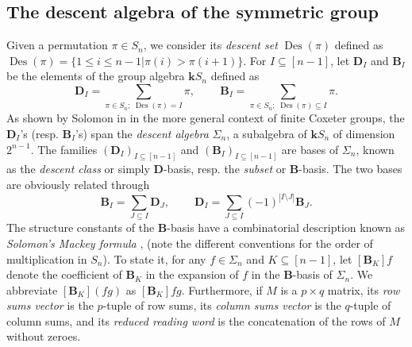 \documentclass[revision]{FPSAC2025}
\newcommand{\Des}{\operatorname{Des}}
\begin{document}
\subsection{The descent algebra of the symmetric group}
Given a permutation $\pi \in S_n$, we consider its \emph{descent set} $\Des(\pi)$ defined as $\Des(\pi) = \{1\leq i\leq n-1| \pi(i)>\pi(i+1)\}.$ 
For $I \subseteq [n-1]$, let $\mathbf{D}_I$ and $\mathbf{B}_I$ be the elements of the group algebra $\mathbf{k}S_n$ defined as \begin{equation*}
\mathbf{D}_I = \sum_{\pi \in S_n; \; \Des(\pi) = I}\pi, \;\;\;\;\;\;\;\; \mathbf{B}_I = \sum_{\pi \in S_n; \; \Des(\pi) \subseteq I}\pi.
\end{equation*} 
As shown by Solomon in \cite{Sol76} in the more general context of finite Coxeter groups, the $\mathbf{D}_I$'s (resp. $\mathbf{B}_I$'s) span the \emph{descent algebra} $\Sigma_n$, a subalgebra of $\mathbf{k}S_n$ of dimension $2^{n-1}$. The families $(\mathbf{D}_I)_{I\subseteq [n-1]}$ and $(\mathbf{B}_I)_{I\subseteq [n-1]}$ are bases of $\Sigma_n$, known as the \emph{descent class} or simply $\mathbf{D}$-basis, resp. the \emph{subset} or $\mathbf{B}$-basis.
The two bases are obviously related through
\begin{equation}
\label{equation.bidj}
\mathbf{B}_I = \sum_{J \subseteq I} \mathbf{D}_J, \;\;\;\;\;\;\;\; \mathbf{D}_I = \sum_{J \subseteq I}(-1)^{|I\setminus J|}\mathbf{B}_J.
\end{equation} 
The structure constants of the $\mathbf{B}$-basis have a combinatorial description %
known as \emph{Solomon's Mackey formula} \cite[Theorem 2]{Willigenburg98}, \cite[Prop. 4.3]{BleLau92} (note the different conventions for the order of multiplication in $S_n$).
To state it, for any $f \in \Sigma_n$ and $K \subseteq [n-1]$, let $[\mathbf{B}_K]f$ denote the coefficient of $\mathbf{B}_K$ in the expansion of $f$ in the $\mathbf{B}$-basis of $\Sigma_n$.
We abbreviate $[\mathbf{B}_K](fg)$ as $[\mathbf{B}_K]fg$.
Furthermore, if $M$ is a $p\times q$ matrix, its \emph{row sums vector} is the $p$-tuple of row sums, its \emph{column sums vector} is the $q$-tuple of column sums, and its \emph{reduced reading word} is the concatenation of the rows of $M$ without zeroes.
\end{document}
